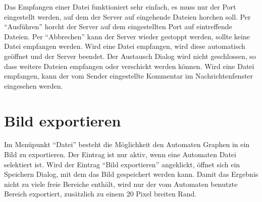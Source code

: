 Das Empfangen einer Datei funktioniert sehr einfach, es muss nur der Port
eingestellt werden, auf dem der Server auf eingehende Dateien horchen soll. Per
"`Ausführen"' horcht der Server auf dem eingestellten Port auf eintreffende
Dateien. Per "`Abbrechen"' kann der Server wieder gestoppt werden, sollte keine
Datei empfangen werden. Wird eine Datei empfangen, wird diese automatisch
geöffnet und der Server beendet. Der Austausch Dialog wird nicht geschlossen, so
dass weitere Dateien empfangen oder verschickt werden können. Wird eine Datei
empfangen, kann der vom Sender eingestellte Kommentar im Nachrichtenfenster
eingesehen werden.


\section{Bild exportieren}

Im Menüpunkt "`Datei"' besteht die Möglichkeit den Automaten Graphen in ein
Bild zu exportieren. Der Eintrag ist nur aktiv, wenn eine Automaten Datei
selektiert ist. Wird der Eintrag "`Bild exportieren"' angeklickt, öffnet sich
ein Speichern Dialog, mit dem das Bild gespeichert werden kann. Damit das
Ergebnis nicht zu viele freie Bereiche enthält, wird nur der vom Automaten
benutzte Bereich exportiert, zusätzlich zu einem 20 Pixel breiten Rand.